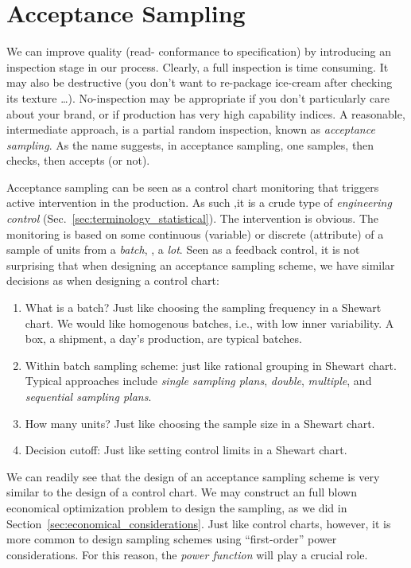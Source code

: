 \chapter{Acceptance Sampling}


We can improve quality (read- conformance to specification) by introducing an inspection stage in our process.
Clearly, a full inspection is time consuming. 
It may also be destructive (you don't want to re-package ice-cream after checking its texture \dots).
No-inspection may be appropriate if you don't particularly care about your brand, or if production has very high capability indices.
A reasonable, intermediate approach, is a partial random inspection, known as \emph{acceptance sampling}.
As the name suggests, in acceptance sampling, one samples, then checks, then accepts (or not).

Acceptance sampling can be seen as a control chart monitoring that triggers active intervention in the production. As such ,it is a crude type of \emph{engineering control} (Sec.~\ref{sec:terminology_statistical}).
The intervention is obvious. The monitoring is based on some continuous (variable) or discrete (attribute) of a sample of units from a \emph{batch}, \aka, a \emph{lot}.
Seen as a feedback control, it is not surprising that when designing an acceptance sampling scheme, we have similar decisions as when designing a control chart:
\begin{enumerate}
\item What is a batch? Just like choosing the sampling frequency in a Shewart chart. 
We would like homogenous batches, i.e., with low inner variability. A box, a shipment, a day's production, are typical batches. 
\item Within batch sampling scheme: just like rational grouping in Shewart chart. Typical approaches include \emph{single sampling plans}, \emph{double}, \emph{multiple}, and \emph{sequential sampling plans}.
\item How many units? Just like choosing the sample size in a Shewart chart.
\item Decision cutoff: Just like setting control limits in a Shewart chart. 
\end{enumerate}
We can readily see that the design of an acceptance sampling scheme is very similar to the design of a control chart. 
We may construct an full blown economical optimization problem to design the sampling, as we did in Section~\ref{sec:economical_considerations}. Just like control charts, however, it is more common to design sampling schemes using ``first-order'' power considerations. 
For this reason, the \emph{power function} will play a crucial role.

